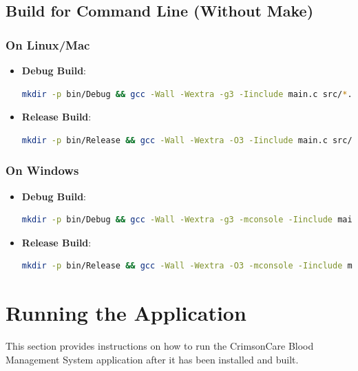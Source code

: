 \documentclass[12pt,a4paper]{report}
\begin{document}
\subsection{Build for Command Line (Without Make)}
\subsubsection{On Linux/Mac}
\begin{itemize}
    \item \normalsize \textbf{Debug Build}:
    \begin{lstlisting}[language=Bash, caption=Building the Application: Debug Build Without Make on Linux/Mac]
    mkdir -p bin/Debug && gcc -Wall -Wextra -g3 -Iinclude main.c src/*.c -o bin/Debug/CrimsonCare
    \end{lstlisting}
    \item \normalsize \textbf{Release Build}:
    \begin{lstlisting}[language=Bash, caption=Building the Application: Release Build Without Make on Linux/Mac]
    mkdir -p bin/Release && gcc -Wall -Wextra -O3 -Iinclude main.c src/*.c -o bin/Release/CrimsonCare
    \end{lstlisting}
\end{itemize}

\subsubsection{On Windows}
\begin{itemize}
    \item \normalsize \textbf{Debug Build}:
    \begin{lstlisting}[language=Bash, caption=Building the Application: Debug Build Without Make on Windows]
    mkdir -p bin/Debug && gcc -Wall -Wextra -g3 -mconsole -Iinclude main.c src/*.c -o bin/Debug/CrimsonCare.exe
    \end{lstlisting}
    \item \normalsize \textbf{Release Build}:
    \begin{lstlisting}[language=Bash, caption=Building the Application: Release Build Without Make on Windows]
    mkdir -p bin/Release && gcc -Wall -Wextra -O3 -mconsole -Iinclude main.c src/*.c -o bin/Release/CrimsonCare.exe
    \end{lstlisting}
\end{itemize}

\section{Running the Application}
This section provides instructions on how to run the CrimsonCare Blood Management System application after it has been installed and built.
\end{document}
